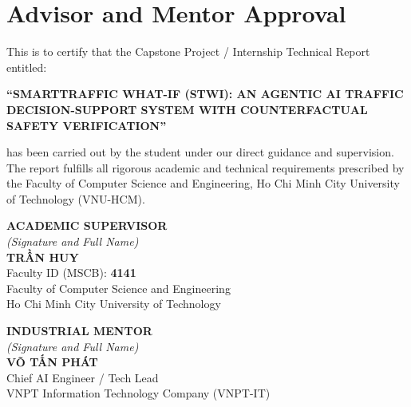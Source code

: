 \chapter*{Advisor and Mentor Approval}

\vspace{0.5cm}

\noindent This is to certify that the Capstone Project / Internship Technical Report entitled:
\begin{center}
\textbf{``SMARTTRAFFIC WHAT-IF (STWI): AN AGENTIC AI TRAFFIC DECISION-SUPPORT SYSTEM WITH COUNTERFACTUAL SAFETY VERIFICATION''}
\end{center}
has been carried out by the student under our direct guidance and supervision. The report fulfills all rigorous academic and technical requirements prescribed by the Faculty of Computer Science and Engineering, Ho Chi Minh City University of Technology (VNU-HCM).

\vspace{1.5cm}

\noindent
\begin{minipage}[t]{0.48\textwidth}
\centering
\textbf{ACADEMIC SUPERVISOR}\\[0.15cm]
\textit{(Signature and Full Name)}\\[2.8cm]
\textbf{TRẦN HUY}\\[0.1cm]
Faculty ID (MSCB): \textbf{4141}\\
Faculty of Computer Science and Engineering\\
Ho Chi Minh City University of Technology
\end{minipage}
\hfill
\begin{minipage}[t]{0.48\textwidth}
\centering
\textbf{INDUSTRIAL MENTOR}\\[0.15cm]
\textit{(Signature and Full Name)}\\[2.8cm]
\textbf{VÕ TẤN PHÁT}\\[0.1cm]
Chief AI Engineer / Tech Lead\\
VNPT Information Technology Company (VNPT-IT)
\end{minipage}
